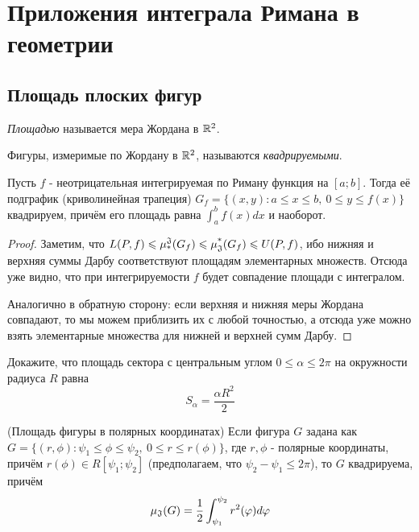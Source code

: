 \section{Приложения интеграла Римана в геометрии}

\subsection{Площадь плоских фигур}

\begin{definition}
	\textit{Площадью} называется мера Жордана в $\mathbb{R}^2$.
\end{definition}

\begin{definition}
	Фигуры, измеримые по Жордану в $\mathbb{R}^2$, называются \textit{квадрируемыми}.
\end{definition}

\begin{theorem}
	Пусть $f$ - неотрицательная интегрируемая по Риману функция на $[a; b]$. Тогда её подграфик (криволинейная трапеция) $G_f = \{(x, y) \colon a \le x \le b,\ 0 \le y \le f(x)\}$ квадрируем, причём его площадь равна $\int_a^b f(x)dx$ и наоборот.
\end{theorem}

\begin{proof}
	Заметим, что $L(P, f) \leqslant \operatorname{\mu^\mathfrak{J}_*}(G_f) \leqslant \operatorname{\mu^*_\mathfrak{J}}(G_f) \leqslant U(P, f)$, ибо нижняя и верхняя суммы Дарбу соответствуют площадям элементарных множеств. Отсюда уже видно, что при интегрируемости $f$ будет совпадение площади с интегралом.
	
	Аналогично в обратную сторону: если верхняя и нижняя меры Жордана совпадают, то мы можем приблизить их с любой точностью, а отсюда уже можно взять элементарные множества для нижней и верхней сумм Дарбу.
\end{proof}

\begin{exercise}
	Докажите, что площадь сектора с центральным углом $0 \le \alpha \le 2\pi$ на окружности радиуса $R$ равна
	\[
		S_\alpha = \frac{\alpha R^2}{2}
	\]
\end{exercise}

\begin{theorem} (Площадь фигуры в полярных координатах)
	Если фигура $G$ задана как $G = \{(r, \phi) \colon \psi_1 \le \phi \le \psi_2,\ 0 \le r \le r(\phi)\}$, где $r, \phi$ - полярные координаты, причём $r(\phi) \in R[\psi_1; \psi_2]$ (предполагаем, что $\psi_2 - \psi_1 \le 2\pi$), то $G$ квадрируема, причём
	\[
		\operatorname{\mu_\mathfrak{J}}(G) = \frac{1}{2} \int_{\psi_1}^{\psi_2} r^2(\varphi)d\varphi
	\]
\end{theorem}

